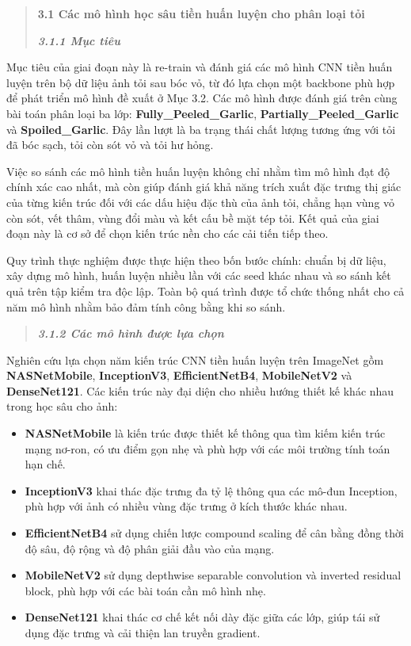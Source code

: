 \documentclass[
]{article}
\begin{document}
\begin{quote}
\protect{}\label{_Toc232112025}{}\textbf{3.1 Các mô hình
học sâu tiền huấn luyện cho phân loại tỏi}

\protect{}\label{_Toc232112026}{}\emph{\textbf{3.1.1 Mục
tiêu}}
\end{quote}

Mục tiêu của giai đoạn này là re-train và đánh giá các mô hình CNN tiền
huấn luyện trên bộ dữ liệu ảnh tỏi sau bóc vỏ, từ đó lựa chọn một
backbone phù hợp để phát triển mô hình đề xuất ở Mục 3.2. Các mô hình
được đánh giá trên cùng bài toán phân loại ba lớp:
\textbf{Fully\_Peeled\_Garlic}, \textbf{Partially\_Peeled\_Garlic} và
\textbf{Spoiled\_Garlic}. Đây lần lượt là ba trạng thái chất lượng
tương ứng với tỏi đã bóc sạch, tỏi còn sót vỏ và tỏi hư hỏng.

Việc so sánh các mô hình tiền huấn luyện không chỉ nhằm tìm mô hình đạt
độ chính xác cao nhất, mà còn giúp đánh giá khả năng trích xuất đặc
trưng thị giác của từng kiến trúc đối với các dấu hiệu đặc thù của ảnh
tỏi, chẳng hạn vùng vỏ còn sót, vết thâm, vùng đổi màu và kết cấu bề mặt
tép tỏi. Kết quả của giai đoạn này là cơ sở để chọn kiến trúc nền cho
các cải tiến tiếp theo.

Quy trình thực nghiệm được thực hiện theo bốn bước chính: chuẩn bị dữ
liệu, xây dựng mô hình, huấn luyện nhiều lần với các seed khác nhau và
so sánh kết quả trên tập kiểm tra độc lập. Toàn bộ quá trình được tổ
chức thống nhất cho cả năm mô hình nhằm bảo đảm tính công bằng khi so
sánh.

\begin{quote}
\protect{}\label{_Toc232112027}{}\emph{\textbf{3.1.2 Các mô
hình được lựa chọn}}
\end{quote}

Nghiên cứu lựa chọn năm kiến trúc CNN tiền huấn luyện trên ImageNet gồm
\textbf{NASNetMobile}, \textbf{InceptionV3}, \textbf{EfficientNetB4},
\textbf{MobileNetV2} và \textbf{DenseNet121}. Các kiến trúc này đại diện
cho nhiều hướng thiết kế khác nhau trong học sâu cho ảnh:

\begin{itemize}
\item
  \textbf{NASNetMobile} là kiến trúc được thiết kế thông qua tìm kiếm
  kiến trúc mạng nơ-ron, có ưu điểm gọn nhẹ và phù hợp với các môi
  trường tính toán hạn chế.
\item
  \textbf{InceptionV3} khai thác đặc trưng đa tỷ lệ thông qua các mô-đun
  Inception, phù hợp với ảnh có nhiều vùng đặc trưng ở kích thước khác
  nhau.
\item
  \textbf{EfficientNetB4} sử dụng chiến lược compound scaling để cân
  bằng đồng thời độ sâu, độ rộng và độ phân giải đầu vào của mạng.
\item
  \textbf{MobileNetV2} sử dụng depthwise separable convolution và inverted
  residual block, phù hợp với các bài toán cần mô hình nhẹ.
\item
  \textbf{DenseNet121} khai thác cơ chế kết nối dày đặc giữa các lớp,
  giúp tái sử dụng đặc trưng và cải thiện lan truyền gradient.
\end{itemize}
\end{document}
